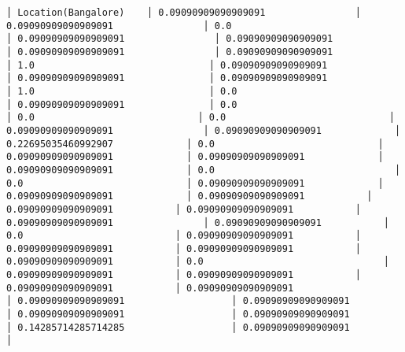 \documentclass[11pt]{article}
\begin{document}
\begin{Verbatim}[commandchars=\\\{\}]
│ Location(Bangalore)    │ 0.09090909090909091                │ 0.09090909090909091                │ 0.0                                │ 0.09090909090909091                │ 0.09090909090909091                │ 0.09090909090909091                │ 0.09090909090909091                │ 1.0                               │ 0.09090909090909091               │ 0.09090909090909091               │ 0.09090909090909091                │ 1.0                               │ 0.0                               │ 0.09090909090909091               │ 0.0                             │ 0.0                             │ 0.0                             │ 0.09090909090909091                │ 0.09090909090909091             │ 0.22695035460992907             │ 0.0                             │ 0.09090909090909091             │ 0.09090909090909091             │ 0.09090909090909091             │ 0.0                                │ 0.0                             │ 0.09090909090909091             │ 0.09090909090909091             │ 0.09090909090909091           │ 0.09090909090909091           │ 0.09090909090909091           │ 0.09090909090909091                │ 0.09090909090909091           │ 0.0                           │ 0.09090909090909091           │ 0.09090909090909091           │ 0.09090909090909091           │ 0.09090909090909091           │ 0.0                                │ 0.09090909090909091           │ 0.09090909090909091           │ 0.09090909090909091           │ 0.09090909090909091                   │ 0.09090909090909091                   │ 0.09090909090909091                   │ 0.09090909090909091                   │ 0.09090909090909091                   │ 0.14285714285714285                   │ 0.09090909090909091                   │

\end{Verbatim}
\end{document}
